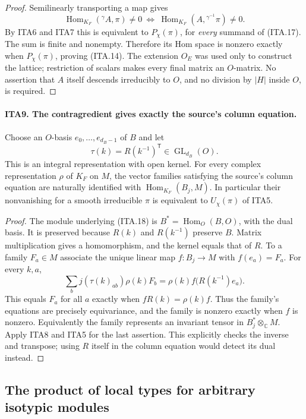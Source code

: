 \begin{proof}
Semilinearly transporting a map gives
\[
 \operatorname{Hom}_{K_F}({}^{\gamma}A,\pi)\ne0
 \ \Longleftrightarrow\
 \operatorname{Hom}_{K_F}(A,{}^{\gamma^{-1}}\pi)\ne0.
\]
By ITA6 and ITA7 this is equivalent to $P_\chi(\pi)$,
for \emph{every} summand of (ITA.17).  The sum is finite
and nonempty.  Therefore its Hom space is nonzero exactly
when $P_\chi(\pi)$, proving (ITA.14).
The extension $O_E$ was used only to construct the lattice;
restriction of scalars makes every final matrix an
$O$-matrix.  No assertion that $A$ itself descends
irreducibly to $O$, and no division by $|H|$ inside $O$,
is required.
\end{proof}

\paragraph{ITA9. The contragredient gives exactly the source's column equation.}
\label{claim:ITA9}
Choose an $O$-basis $e_0,\ldots,e_{d_B-1}$ of $B$ and let
\[
                \tau(k)=R(k^{-1})^{\mathsf T}
                       \in\operatorname{GL}_{d_B}(O).          \tag{ITA.18}
\]
This is an integral representation with open kernel.  For
every complex representation $\rho$ of $K_F$ on $M$,
the vector families satisfying the source's column equation
are naturally identified with
$\operatorname{Hom}_{K_F}(B_j,M)$.  In particular their
nonvanishing for a smooth irreducible $\pi$ is equivalent
to $U_\chi(\pi)$ of ITA5.
\begin{proof}
The module underlying (ITA.18) is $B^*=\operatorname{Hom}_O(B,O)$,
with the dual basis.  It is preserved because $R(k)$ and
$R(k^{-1})$ preserve $B$.  Matrix multiplication gives a
homomorphism, and the kernel equals that of $R$.
To a family $F_a\in M$ associate the unique linear map
$f:B_j\to M$ with $f(e_a)=F_a$.  For every $k,a$,
\[
 \sum_b j(\tau(k)_{ab})\rho(k)F_b
       =\rho(k)f\bigl(R(k^{-1})e_a\bigr).                   \tag{ITA.19}
\]
This equals $F_a$ for all $a$ exactly when
$fR(k)=\rho(k)f$.  Thus the family's equations are
precisely equivariance, and the family is nonzero exactly
when $f$ is nonzero.  Equivalently the family represents
an invariant tensor in $B_j^*\otimes_{\mathbb C}M$.
Apply ITA8 and ITA5 for the last assertion.  This explicitly
checks the inverse and transpose; using $R$ itself in
the column equation would detect its dual instead.
\end{proof}

\subsection{The product of local types for arbitrary isotypic modules}

